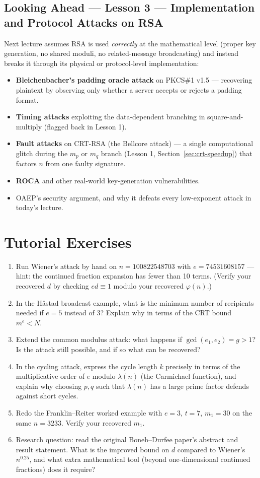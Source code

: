 \subsection*{Looking Ahead --- Lesson 3 — Implementation and Protocol Attacks on RSA}
Next lecture assumes RSA is used \emph{correctly} at the mathematical level (proper key generation, no shared moduli, no related-message broadcasting) and instead breaks it through its physical or protocol-level implementation:
\begin{itemize}
\item \textbf{Bleichenbacher's padding oracle attack} on PKCS\#1 v1.5 — recovering plaintext by observing only whether a server accepts or rejects a padding format.
\item \textbf{Timing attacks} exploiting the data-dependent branching in square-and-multiply (flagged back in Lesson 1).
\item \textbf{Fault attacks} on CRT-RSA (the Bellcore attack) — a single computational glitch during the $m_p$ or $m_q$ branch (Lesson 1, Section~\ref{sec:crt-speedup}) that factors $n$ from one faulty signature.
\item \textbf{ROCA} and other real-world key-generation vulnerabilities.
\item OAEP's security argument, and why it defeats every low-exponent attack in today's lecture.
\end{itemize}

\section*{Tutorial Exercises}
\begin{enumerate}
\item Run Wiener's attack by hand on $n = 100822548703$ with $e = 74531608157$ — hint: the continued fraction expansion has fewer than 10 terms. (Verify your recovered $d$ by checking $ed \equiv 1$ modulo your recovered $\varphi(n)$.)
\item In the Håstad broadcast example, what is the minimum number of recipients needed if $e = 5$ instead of $3$? Explain why in terms of the CRT bound $m^e < N$.
\item Extend the common modulus attack: what happens if $\gcd(e_1,e_2) = g > 1$? Is the attack still possible, and if so what can be recovered?
\item In the cycling attack, express the cycle length $k$ precisely in terms of the multiplicative order of $e$ modulo $\lambda(n)$ (the Carmichael function), and explain why choosing $p,q$ such that $\lambda(n)$ has a large prime factor defends against short cycles.
\item Redo the Franklin--Reiter worked example with $e=3$, $t=7$, $m_1 = 30$ on the same $n=3233$. Verify your recovered $m_1$.
\item Research question: read the original Boneh--Durfee paper's abstract and result statement. What is the improved bound on $d$ compared to Wiener's $n^{0.25}$, and what extra mathematical tool (beyond one-dimensional continued fractions) does it require?
\end{enumerate}
